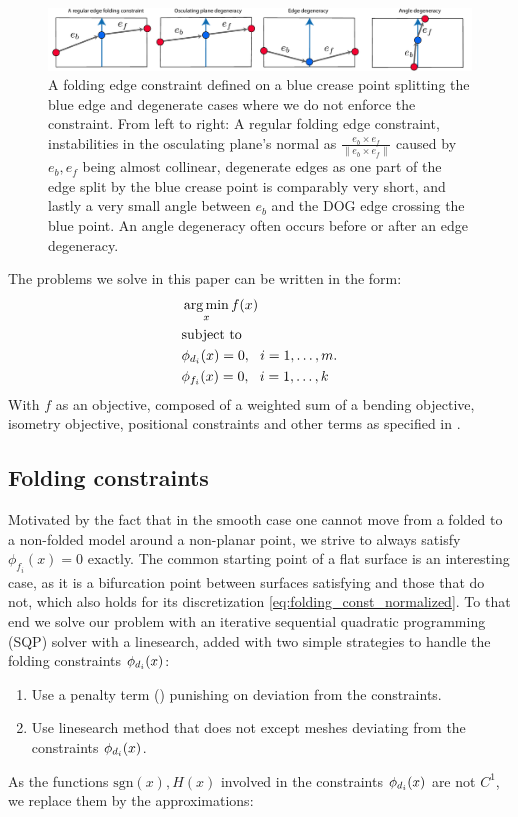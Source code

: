 \begin{figure} [h]
	\centering
	\includegraphics[width=\linewidth]{figures/fold_const_degeneracies}
	\caption{A folding edge constraint defined on a blue crease point splitting the blue edge and degenerate cases where we do not enforce the constraint. From left to right: A regular folding edge constraint, instabilities in the osculating plane's normal as $\frac{e_b \times e_f}{\|e_b \times e_f\|}$ caused by $e_b,e_f$ being almost collinear, degenerate edges as one part of the edge split by the blue crease point is comparably very short, and lastly a very small angle between $e_b$ and the DOG edge crossing the blue point. An angle degeneracy often occurs before or after an edge degeneracy.}
	\label{fig:fold_const_degeneracies}
\end{figure}

The problems we solve in this paper can be written in the form:
\begin{equation} \label{eq:const_opt}
\begin{aligned}
& \operatorname*{arg\,min}_x f(x) \\
& \textrm{subject to} \\
& \phi_{d_i}(x) = 0, \ \  i = 1, \ldots, m. \\
& \phi_{f_i}(x) = 0, \ \  i = 1, \ldots, k \\ 
\end{aligned}
\end{equation}
With $f$ as an objective, composed of a weighted sum of a bending objective, isometry objective, positional constraints and other terms as specified in .

\subsection{Folding constraints}
Motivated by the fact that in the smooth case one cannot move from a folded to a non-folded model around a non-planar point, we strive to always satisfy $\phi_{f_i}(x) = 0$ exactly. The common starting point of a flat surface is an interesting case, as it is a bifurcation point between surfaces satisfying  and those that do not, which also holds for its discretization \eqref{eq:folding_const_normalized}. To that end we solve our problem with an iterative sequential quadratic programming (SQP) solver with a linesearch, added with two simple strategies to handle the folding constraints $\phi_{d_i}(x)$:
\begin{enumerate}
	\item Use a penalty term (\cite{nocedal}) punishing on deviation from the constraints. \label{opt:penalty}
	\item Use linesearch method that does not except meshes deviating from the constraints $\phi_{d_i}(x)$.
\end{enumerate}
As the functions $\text{sgn}(x),H(x)$ involved in the constraints $\phi_{d_i}(x)$ are not $C^1$, we replace them by the approximations:

